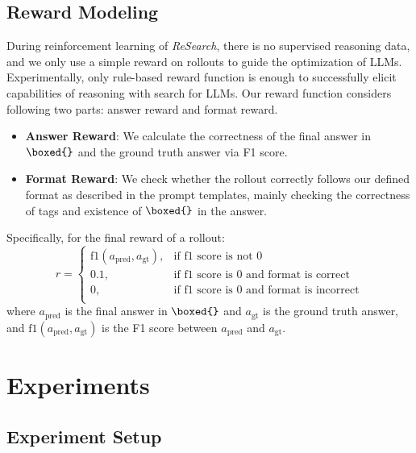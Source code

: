 \documentclass{article}
\begin{document}
\subsection{Reward Modeling}
\label{sec:method-reward}

During reinforcement learning of \textit{ReSearch}, there is no supervised reasoning data, and we only use a simple reward on rollouts to guide the optimization of LLMs. Experimentally, only rule-based reward function is enough to successfully elicit capabilities of reasoning with search for LLMs. Our reward function considers following two parts: answer reward and format reward. 
\begin{itemize}[leftmargin=*]
  \item \textbf{Answer Reward}: We calculate the correctness of the final answer in $\verb|\boxed{}|$ and the ground truth answer via F1 score.
  \item \textbf{Format Reward}: We check whether the rollout correctly follows our defined format as described in the prompt templates, mainly checking the correctness of tags and existence of $\verb|\boxed{}|$ in the answer.
\end{itemize}
Specifically, for the final reward of a rollout:
\begin{equation}
  r = 
  \begin{cases}
    \text{f1}(a_{\text{pred}}, a_{\text{gt}}), & \text{if f1 score is not 0} \\
    0.1, & \text{if f1 score is 0 and format is correct} \\
    0, & \text{if f1 score is 0 and format is incorrect} \\
  \end{cases}
\end{equation}
where $a_{\text{pred}}$ is the final answer in $\verb|\boxed{}|$ and $a_{\text{gt}}$ is the ground truth answer, and $\text{f1}(a_{\text{pred}}, a_{\text{gt}})$ is the F1 score between $a_{\text{pred}}$ and $a_{\text{gt}}$.

\section{Experiments}

\subsection{Experiment Setup}
\end{document}

